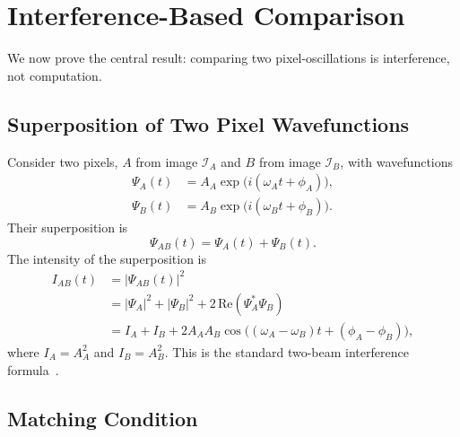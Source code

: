 \documentclass[11pt,twocolumn,a4paper]{article}
\begin{document}
\section{Interference-Based Comparison}\label{sec:interference}


We now prove the central result: comparing two pixel-oscillations is interference, not computation.

\subsection{Superposition of Two Pixel Wavefunctions}

Consider two pixels, $A$ from image $\mathcal{I}_A$ and $B$ from image $\mathcal{I}_B$, with wavefunctions
\begin{align}
    \Psi_A(t) &= A_A \exp\!\big(i(\omega_A t + \phi_A)\big), \\
    \Psi_B(t) &= A_B \exp\!\big(i(\omega_B t + \phi_B)\big).
\end{align}
Their superposition is
\begin{equation}
    \Psi_{AB}(t) = \Psi_A(t) + \Psi_B(t).
\end{equation}
The intensity of the superposition is
\begin{align}
    I_{AB}(t) &= |\Psi_{AB}(t)|^2 \nonumber \\
    &= |\Psi_A|^2 + |\Psi_B|^2 + 2\,\text{Re}\!\left(\Psi_A^* \Psi_B\right) \nonumber \\
    &= I_A + I_B + 2 A_A A_B \cos\!\big((\omega_A - \omega_B)t + (\phi_A - \phi_B)\big),
    \label{eq:interference}
\end{align}
where $I_A = A_A^2$ and $I_B = A_B^2$. This is the standard two-beam interference formula~\citep{born1999, hecht2017}.

\subsection{Matching Condition}
\end{document}
